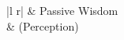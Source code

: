 \begin{tabular}{|l r|}
\hline
{}
{\ovalbox{\DndPassivePerception}}
& {\tiny Passive Wisdom} \\
& {\small (Perception)} \\
\hline
\end{tabular}
